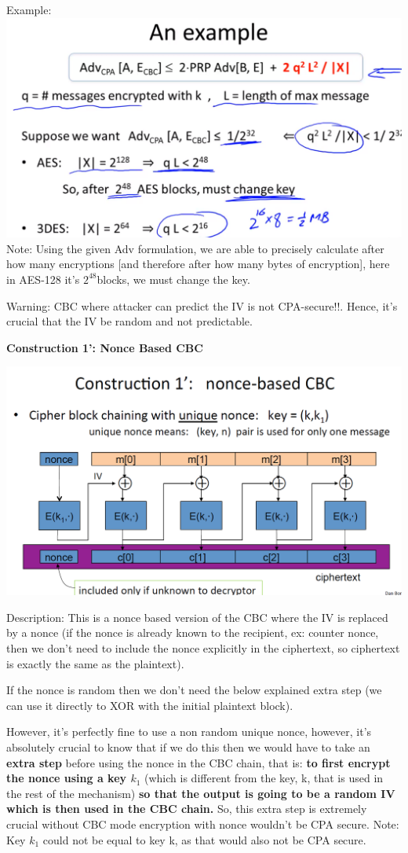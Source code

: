 \documentclass[11pt]{article}
\makeatletter
\def\maxwidth{\ifdim\Gin@nat@width>\linewidth\linewidth
    \else\Gin@nat@width\fi}
\let\Oldincludegraphics\includegraphics
\renewcommand{\includegraphics}[1]{\Oldincludegraphics[width=.8\maxwidth]{#1}}
\makeatother
\begin{document}
Example: \includegraphics{./Images/CBC-CPA-Ex.png} Note: Using the given
Adv formulation, we are able to precisely calculate after how many
encryptions {[}and therefore after how many bytes of encryption{]}, here
in AES-128 it's \(2^{48}\)blocks, we must change the key.

Warning: CBC where attacker can predict the IV is not CPA-secure!!.
Hence, it's crucial that the IV be random and not predictable.

\textbf{Construction 1': Nonce Based CBC}

\includegraphics{./Images/NonceBasedCBC.png}

Description: This is a nonce based version of the CBC where the IV is
replaced by a nonce (if the nonce is already known to the recipient, ex:
counter nonce, then we don't need to include the nonce explicitly in the
ciphertext, so ciphertext is exactly the same as the plaintext).

If the nonce is random then we don't need the below explained extra step
(we can use it directly to XOR with the initial plaintext block).

However, it's perfectly fine to use a non random unique nonce, however,
it's absolutely crucial to know that if we do this then we would have to
take an \textbf{extra step} before using the nonce in the CBC chain,
that is: \textbf{to first encrypt the nonce using a key \(k_{1}\)}
(which is different from the key, k, that is used in the rest of the
mechanism) \textbf{so that the output is going to be a random IV which
is then used in the CBC chain.} So, this extra step is extremely crucial
without CBC mode encryption with nonce wouldn't be CPA secure. Note: Key
\(k_{1}\) could not be equal to key k, as that would also not be CPA
secure.
\end{document}
